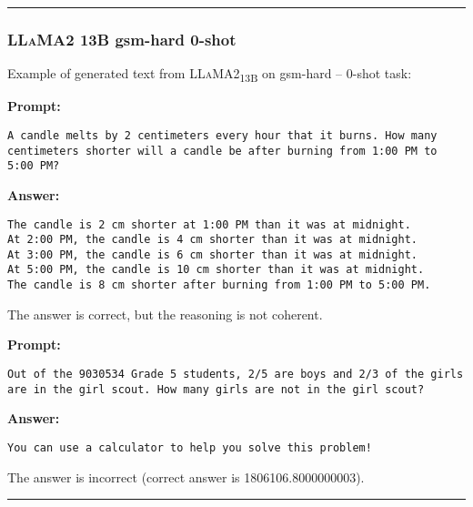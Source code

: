 \noindent\rule{\textwidth}{0.4pt}

\subsubsection*{\textsc{LLaMA}2 13B gsm-hard 0-shot}
\noindent Example of generated text from \textsc{LLaMA}2\textsubscript{13B} on gsm-hard -- 0-shot task:
\begin{displayquote}
	\textbf{Prompt:}
	\begin{Verbatim}[fontsize=\small,breaklines]
A candle melts by 2 centimeters every hour that it burns. How many centimeters shorter will a candle be after burning from 1:00 PM to 5:00 PM?
	\end{Verbatim}
	\textbf{Answer:}
	\begin{Verbatim}[fontsize=\small,breaklines]
The candle is 2 cm shorter at 1:00 PM than it was at midnight.
At 2:00 PM, the candle is 4 cm shorter than it was at midnight.
At 3:00 PM, the candle is 6 cm shorter than it was at midnight.
At 5:00 PM, the candle is 10 cm shorter than it was at midnight.
The candle is 8 cm shorter after burning from 1:00 PM to 5:00 PM.
	\end{Verbatim}
\end{displayquote}
The answer is correct, but the reasoning is not coherent.
\begin{displayquote}
	\textbf{Prompt:}
	\begin{Verbatim}[fontsize=\small,breaklines]
Out of the 9030534 Grade 5 students, 2/5 are boys and 2/3 of the girls are in the girl scout. How many girls are not in the girl scout?
	\end{Verbatim}
	\textbf{Answer:}
	\begin{Verbatim}[fontsize=\small,breaklines]
You can use a calculator to help you solve this problem!
	\end{Verbatim}
\end{displayquote}
The answer is incorrect (correct answer is 1806106.8000000003).

\noindent\rule{\textwidth}{0.4pt}

